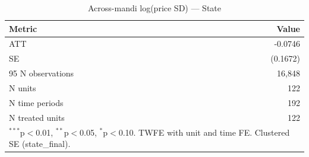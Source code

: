 \begin{table}[htbp]
\centering
\caption{Across-mandi log(price SD) — State}
\label{tab:spec3_across_state_pooled}
\begin{tabular}{lr}
\hline\hline
Metric & Value \\
\hline
ATT & -0.0746 \\
SE & (0.1672) \\
95%
N observations & 16,848 \\
N units & 122 \\
N time periods & 192 \\
N treated units & 122 \\
\hline\hline
\multicolumn{2}{l}{\footnotesize $^{***}$p$<$0.01, $^{**}$p$<$0.05, $^{*}$p$<$0.10. TWFE with unit and time FE. Clustered SE (state_final).} \\
\end{tabular}
\end{table}